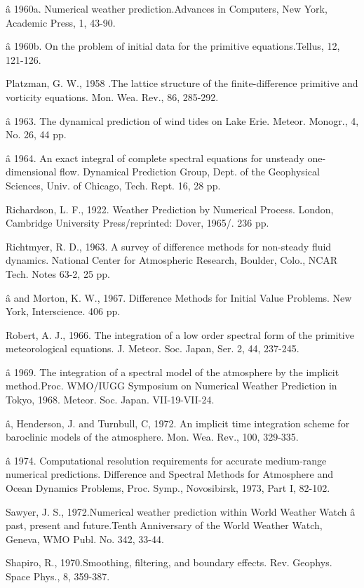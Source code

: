 â 1960a. Numerical weather prediction.Advances in Computers, New York,
Academic Press, 1, 43-90.

â 1960b. On the problem of initial data for the primitive
equations.Tellus, 12, 121-126.

Platzman, G. W., 1958 .The lattice structure of the finite-difference
primitive and vorticity equations. Mon. Wea. Rev., 86, 285-292.

â 1963. The dynamical prediction of wind tides on Lake Erie. Meteor.
Monogr., 4, No. 26, 44 pp.

â 1964. An exact integral of complete spectral equations for unsteady
one-dimensional flow. Dynamical Prediction Group, Dept. of the
Geophysical Sciences, Univ. of Chicago, Tech. Rept. 16, 28 pp.

Richardson, L. F., 1922. Weather Prediction by Numerical Process.
London, Cambridge University Press/reprinted: Dover, 1965/. 236 pp.

Richtmyer, R. D., 1963. A survey of difference methods for non-steady
fluid dynamics. National Center for Atmospheric Research, Boulder,
Colo., NCAR Tech. Notes 63-2, 25 pp.

â and Morton, K. W., 1967. Difference Methods for Initial Value
Problems. New York, Interscience. 406 pp.

Robert, A. J., 1966. The integration of a low order spectral form of the
primitive meteorological equations. J. Meteor. Soc. Japan, Ser. 2, 44,
237-245.

â 1969. The integration of a spectral model of the atmosphere by the
implicit method.Proc. WMO/IUGG Symposium on Numerical Weather Prediction
in Tokyo, 1968. Meteor. Soc. Japan. VII-19-VII-24.

â, Henderson, J. and Turnbull, C, 1972. An implicit time integration
scheme for baroclinic models of the atmosphere. Mon. Wea. Rev., 100,
329-335.

â 1974. Computational resolution requirements for accurate medium-range
numerical predictions. Difference and Spectral Methods for Atmosphere
and Ocean Dynamics Problems, Proc. Symp., Novosibirsk, 1973, Part I,
82-102.

Sawyer, J. S., 1972.Numerical weather prediction within World Weather
Watch â past, present and future.Tenth Anniversary of the World Weather
Watch, Geneva, WMO Publ. No. 342, 33-44.

Shapiro, R., 1970.Smoothing, filtering, and boundary effects. Rev.
Geophys. Space Phys., 8, 359-387.

